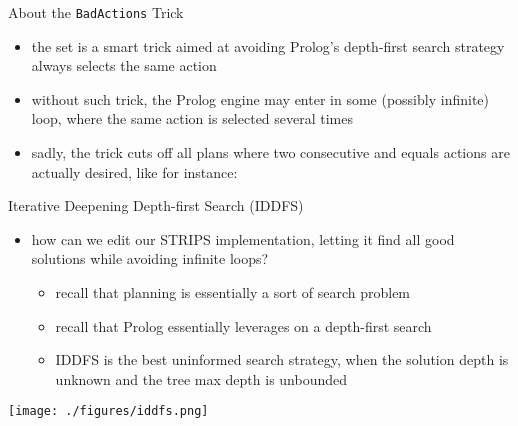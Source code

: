 \documentclass[presentation]{beamer}\mode<presentation>{\usetheme{AMSBolognaFC}}
\begin{document}
\begin{frame}[c]{About the \texttt{BadActions} Trick}

    \begin{itemize}
        \item the  set is a smart trick aimed at avoiding Prolog's \alert{depth-first} search strategy always selects the same action

        \vfill

        \item without such trick, the Prolog engine may enter in some (possibly \alert{infinite}) loop, where the same action is selected several times

        \vfill

        \item sadly, the trick \alert{cuts off} all plans where two consecutive and equals actions are actually desired, like for instance:
        
    \end{itemize}

\end{frame}

\begin{frame}[c,allowframebreaks]{Iterative Deepening Depth-first Search (IDDFS)}

    \begin{itemize}
        \item how can we edit our STRIPS implementation, letting it find \alert{all} good solutions while avoiding infinite loops?
        \begin{itemize}
            \item recall that planning is essentially a sort of \alert{search} problem
            \item recall that Prolog essentially leverages on a \alert{depth-first} search
            \item IDDFS is the best \alert{uninformed} search strategy, when the solution depth is unknown and the tree max depth is unbounded
        \end{itemize}
    \end{itemize}

\framebreak

\begin{center}
    \texttt{[image: ./figures/iddfs.png]}
\end{center}


\end{frame}
\end{document}
